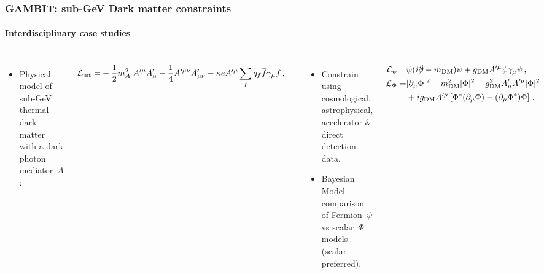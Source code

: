 \documentclass[aspectratio=169]{beamer}
\begin{document}
\begin{frame}
    \frametitle{GAMBIT: sub-GeV Dark matter constraints}
    \framesubtitle{Interdisciplinary case studies}
    \begin{columns}
        \begin{itemize}
            \item Physical model of sub-GeV thermal dark matter with a dark photon mediator~$A$:
        \end{itemize}
        \vspace{-10pt}
        \begin{align*}
            \small
            \mathcal{L}_\text{int} =& -\frac{1}{2} m_{A'}^2 A'^\mu A'_\mu - \frac{1}{4} A'^{\mu\nu}A'_{\mu\nu} -\kappa e A'^\mu \sum_{f} q_f \overline{f} \gamma_\mu f \,,
            \normalsize
        \end{align*}
        \vspace{-15pt}
        \begin{itemize}
            \item Constrain using cosmological, astrophysical, accelerator \& direct detection data.
            \item Bayesian Model comparison of Fermion~$\psi$ vs scalar~$\Phi$ models (scalar preferred).
        \end{itemize}
        \vspace{-10pt}
        \begin{align*}
            \small
            \mathcal{L}_\psi  =& \bar{\psi}(i \slashed{\partial} - m_\text{DM}) \psi + g_\text{DM} A'^\mu \bar{\psi} \gamma_\mu \psi \,,\\
            \mathcal{L}_\Phi  =& |\partial_\mu \Phi|^2 - m_\text{DM}^2 |\Phi|^2 - g_\text{DM}^2 A'_\mu A'^\mu |\Phi|^2 \\ &+ i g_\text{DM} A'^\mu \left[\Phi^\ast (\partial_\mu \Phi) - (\partial_\mu \Phi^\ast) \Phi\right]\,,
            \normalsize
        \end{align*}

\end{columns}
\end{frame}
\end{document}
